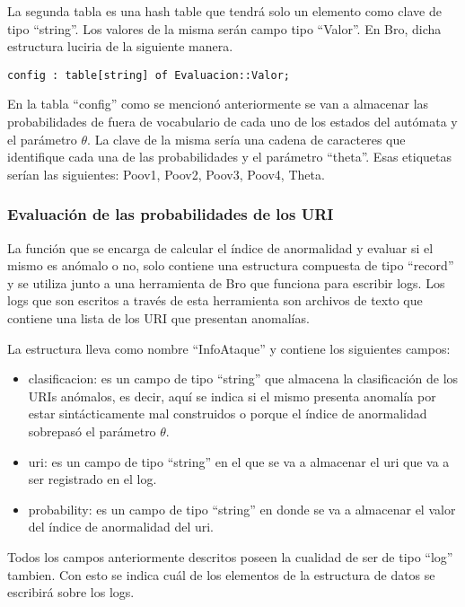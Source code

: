 La segunda tabla es una hash table que tendrá solo un elemento como clave de tipo “string”. Los valores de la misma serán campo tipo “Valor”. En Bro, dicha estructura luciria de la siguiente manera.

\begin{verbatim}
config : table[string] of Evaluacion::Valor;
\end{verbatim}

En la tabla “config” como se mencionó anteriormente se van a almacenar las probabilidades de fuera de vocabulario de cada uno de los estados del autómata y el parámetro $\theta$. La clave de la misma sería una cadena de caracteres que identifique cada una de las probabilidades  y el parámetro “theta”. Esas etiquetas serían las siguientes: Poov1, Poov2, Poov3, Poov4, Theta.  

\subsubsection{Evaluación de las probabilidades de los URI}
\label{sssec:estructuraEvaluacion}

La función  que se encarga de calcular el índice de anormalidad  y evaluar si el mismo es anómalo o no, solo contiene una estructura compuesta de tipo “record” y se utiliza junto a una herramienta de Bro que funciona para escribir logs. Los logs que son escritos a través de esta herramienta son archivos de texto que contiene una lista de los URI que presentan anomalías.

La estructura lleva como nombre “InfoAtaque” y contiene los siguientes campos:

\begin{itemize}
\item clasificacion: es un campo de tipo “string” que almacena la clasificación de los URIs anómalos, es decir, aquí se indica si el mismo presenta anomalía por estar sintácticamente mal construidos o porque el índice de anormalidad sobrepasó el parámetro $\theta$.
\item uri: es un campo de tipo “string” en el que se va a almacenar el uri que va a ser registrado en el log.
\item probability: es un campo de tipo “string” en donde se va a almacenar el valor del índice de anormalidad del uri.
\end{itemize}

Todos los campos anteriormente descritos poseen la cualidad de ser de tipo “log” tambien. Con esto se indica cuál de los elementos de la estructura de datos se escribirá sobre los logs.

